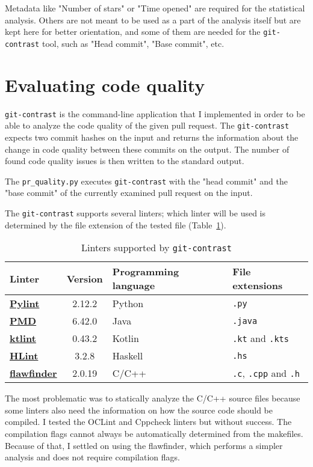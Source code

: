 \documentclass[digital,oneside,oldtable,nolof,nolot,nocover]{fithesis4}
\begin{document}
Metadata like "Number of stars" or "Time opened" are required for the
statistical analysis.  Others are not meant to be used as a part of the
analysis itself but are kept here for better orientation, and some of them
are needed for the \texttt{git-contrast} tool, such as "Head commit", "Base commit", etc.
\FloatBarrier
\section{Evaluating code quality}
\label{sec:org5150609}
\texttt{git-contrast} is the command-line application that I implemented in order to
be able to analyze the code quality of the given pull request. The \texttt{git-contrast}
expects two commit hashes on the input and returns the information about the
change in code quality between these commits on the output.
The number of found code quality issues is
then written to the standard output.

The \texttt{pr\_quality.py} executes \texttt{git-contrast} with the "head commit" and the "base commit" of the
currently examined pull request on the input.

The \texttt{git-contrast} supports several linters; which linter will be
used is determined by the file extension of the tested file (Table~\ref{tab:org25c83bc}).
\begin{table}[htbp]
\caption{\label{tab:org25c83bc}Linters supported by \texttt{git-contrast}}
\centering
\scriptsize
\begin{tabular}{|lcll|}
\hline
Linter & Version & Programming language & File extensions\\
\hline
\hline
\href{https://pylint.pycqa.org/}{\textbf{Pylint}} & 2.12.2 & Python & \texttt{.py}\\
\href{https://pmd.github.io/}{\textbf{PMD}} & 6.42.0 & Java & \texttt{.java}\\
\href{https://ktlint.github.io/}{\textbf{ktlint}} & 0.43.2 & Kotlin & \texttt{.kt} and \texttt{.kts}\\
\href{https://github.com/ndmitchell/hlint}{\textbf{HLint}} & 3.2.8 & Haskell & \texttt{.hs}\\
\href{https://dwheeler.com/flawfinder/}{\textbf{flawfinder}} & 2.0.19 & C/C++ & \texttt{.c}, \texttt{.cpp} and \texttt{.h}\\
\hline
\end{tabular}
\end{table}

The most problematic was to statically analyze the C/C++ source files because
some linters also need the information on how the source code should be
compiled. I tested the OCLint and Cppcheck linters but without success.
The compilation flags cannot always be automatically determined from the makefiles.
Because of that, I settled on using the flawfinder, which performs a simpler analysis and
does not require compilation flags.
\end{document}
